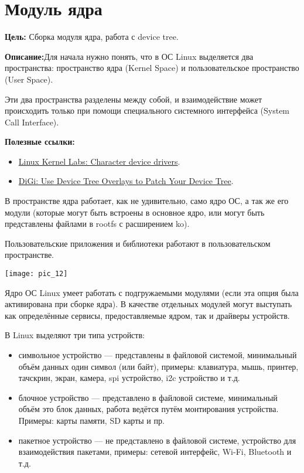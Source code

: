 \chapter{Модуль ядра}\label{lab:char_dev}
\textbf{Цель:} Сборка модуля ядра, работа с device tree.

\vspace{5mm}
\textbf{Описание:}Для начала нужно понять, что в ОС Linux выделяется два пространства: пространство ядра (Kernel Space) и пользовательское пространство (User Space).

Эти два пространства разделены между собой, и взаимодействие может происходить только при помощи специального системного интерфейса (System Call Interface).

\vspace{5mm}
\textbf{Полезные ссылки:}
\begin{itemize}
	\item \href{https://linux-kernel-labs.github.io/refs/heads/master/labs/device_drivers.html}{Linux Kernel Labs: Character device drivers}.
	\item \href{https://www.digi.com/resources/examples-guides/use-device-tree-overlays-to-patch-your-device-tree}{DiGi: Use Device Tree Overlays to Patch Your Device Tree}.
\end{itemize}

В пространстве ядра работает, как не удивительно, само ядро ОС, а так же его модули (которые могут быть встроены в основное ядро, или могут быть представлены файлами в rootfs с расширением ko).

Пользовательские приложения и библиотеки работают в пользовательском пространстве. 

\begin{center}
	\texttt{[image: pic\_12]}
\end{center}

Ядро ОС Linux умеет работать с подгружаемыми модулями (если эта опция была активирована при сборке ядра). В качестве отдельных модулей могут выступать как определённые сервисы, предоставляемые ядром, так и драйверы устройств.

В Linux выделяют три типа устройств:
\begin{itemize}
	\item символьное устройство — представлены в файловой системой, минимальный объём данных один символ (или байт), примеры: клавиатура, мышь, принтер, тачскрин, экран, камера, spi устройство, i2c устройство и т.д. 
	\item блочное устройство — представлено в файловой системе, минимальный объём это блок данных, работа ведётся путём монтирования устройства. Примеры: карты памяти, SD карты и пр.  
	\item пакетное устройство — не представлено в файловой системе, устройство для взаимодействия пакетами, примеры: сетевой интерфейс, Wi-Fi, Bluetooth и т.д. 
\end{itemize}

